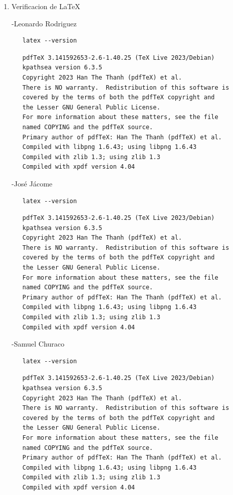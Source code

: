 \documentclass{article}
\begin{document}
\begin{enumerate}
\item Verificacion de \LaTeX{}

-Leonardo Rodriguez
\begin{verbatim}
   latex --version
\end{verbatim}

\begin{verbatim}
   pdfTeX 3.141592653-2.6-1.40.25 (TeX Live 2023/Debian)
   kpathsea version 6.3.5
   Copyright 2023 Han The Thanh (pdfTeX) et al.
   There is NO warranty.  Redistribution of this software is
   covered by the terms of both the pdfTeX copyright and
   the Lesser GNU General Public License.
   For more information about these matters, see the file
   named COPYING and the pdfTeX source.
   Primary author of pdfTeX: Han The Thanh (pdfTeX) et al.
   Compiled with libpng 1.6.43; using libpng 1.6.43
   Compiled with zlib 1.3; using zlib 1.3
   Compiled with xpdf version 4.04
\end{verbatim}

-José Jácome
\begin{verbatim}
   latex --version
\end{verbatim}

\begin{verbatim}
   pdfTeX 3.141592653-2.6-1.40.25 (TeX Live 2023/Debian)
   kpathsea version 6.3.5
   Copyright 2023 Han The Thanh (pdfTeX) et al.
   There is NO warranty.  Redistribution of this software is
   covered by the terms of both the pdfTeX copyright and
   the Lesser GNU General Public License.
   For more information about these matters, see the file
   named COPYING and the pdfTeX source.
   Primary author of pdfTeX: Han The Thanh (pdfTeX) et al.
   Compiled with libpng 1.6.43; using libpng 1.6.43
   Compiled with zlib 1.3; using zlib 1.3
   Compiled with xpdf version 4.04
\end{verbatim}

-Samuel Churaco
\begin{verbatim}
   latex --version
\end{verbatim}

\begin{verbatim}
   pdfTeX 3.141592653-2.6-1.40.25 (TeX Live 2023/Debian)
   kpathsea version 6.3.5
   Copyright 2023 Han The Thanh (pdfTeX) et al.
   There is NO warranty.  Redistribution of this software is
   covered by the terms of both the pdfTeX copyright and
   the Lesser GNU General Public License.
   For more information about these matters, see the file
   named COPYING and the pdfTeX source.
   Primary author of pdfTeX: Han The Thanh (pdfTeX) et al.
   Compiled with libpng 1.6.43; using libpng 1.6.43
   Compiled with zlib 1.3; using zlib 1.3
   Compiled with xpdf version 4.04
\end{verbatim}
\end{enumerate}
\end{document}
